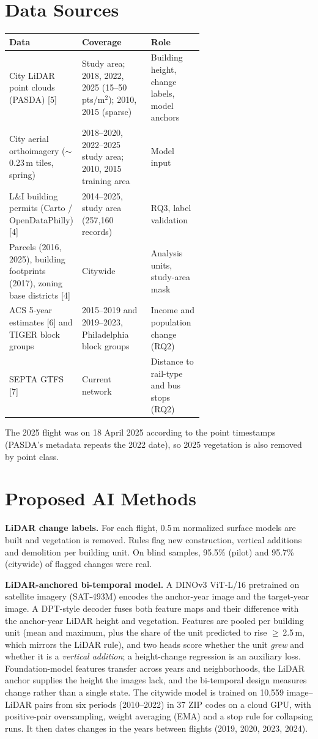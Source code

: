 \documentclass{article}
\begin{document}
\section{Data Sources}
\begin{tabularx}{\linewidth}{@{}>{\raggedright}p{0.36\linewidth}>{\raggedright}X>{\raggedright\arraybackslash}p{0.27\linewidth}@{}}
\toprule
Data & Coverage & Role\\ \midrule
City LiDAR point clouds (PASDA) [5] & Study area; 2018, 2022, 2025 (15--50 pts/m$^2$); 2010, 2015 (sparse) & Building height, change labels, model anchors\\
City aerial orthoimagery ($\sim$0.23\,m tiles, spring) & 2018--2020, 2022--2025 study area; 2010, 2015 training area & Model input\\
L\&I building permits (Carto / OpenDataPhilly) [4] & 2014--2025, study area (257,160 records) & RQ3, label validation\\
Parcels (2016, 2025), building footprints (2017), zoning base districts [4] & Citywide & Analysis units, study-area mask\\
ACS 5-year estimates [6] and TIGER block groups & 2015--2019 and 2019--2023, Philadelphia block groups & Income and population change (RQ2)\\
SEPTA GTFS [7] & Current network & Distance to rail-type and bus stops (RQ2)\\ \bottomrule
\end{tabularx}

The 2025 flight was on 18 April 2025 according to the point timestamps (PASDA's metadata repeats the 2022 date), so 2025 vegetation is also removed by point class.

\section{Proposed AI Methods}
\textbf{LiDAR change labels.} For each flight, 0.5\,m normalized surface models are built and vegetation is removed. Rules flag new construction, vertical additions and demolition per building unit. On blind samples, 95.5\% (pilot) and 95.7\% (citywide) of flagged changes were real.

\textbf{LiDAR-anchored bi-temporal model.} A DINOv3 ViT-L/16 pretrained on satellite imagery (SAT-493M) encodes the anchor-year image and the target-year image. A DPT-style decoder fuses both feature maps and their difference with the anchor-year LiDAR height and vegetation. Features are pooled per building unit (mean and maximum, plus the share of the unit predicted to rise $\geq$\,2.5\,m, which mirrors the LiDAR rule), and two heads score whether the unit \emph{grew} and whether it is a \emph{vertical addition}; a height-change regression is an auxiliary loss. Foundation-model features transfer across years and neighborhoods, the LiDAR anchor supplies the height the images lack, and the bi-temporal design measures change rather than a single state. The citywide model is trained on 10,559 image--LiDAR pairs from six periods (2010--2022) in 37 ZIP codes on a cloud GPU, with positive-pair oversampling, weight averaging (EMA) and a stop rule for collapsing runs. It then dates changes in the years between flights (2019, 2020, 2023, 2024).
\end{document}
